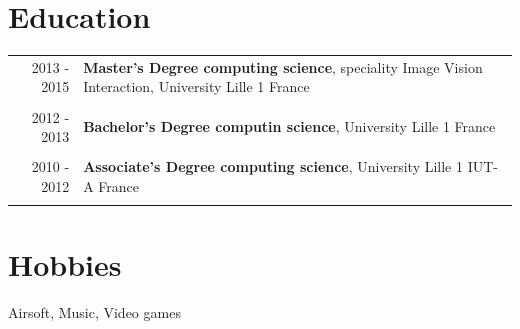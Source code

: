 \documentclass[9pt]{article}
\begin{document}
\section{Education}
\begin{tabular}{rl}    
	2013 - 2015& \textbf{Master's Degree computing science}, speciality Image Vision Interaction, {\small  University Lille 1 France}\\ & \\	
	2012 - 2013& \textbf{Bachelor's Degree computin science}, {\small  University Lille 1 France}\\ & \\	
	2010 - 2012& \textbf{Associate's Degree computing science}, {\small University Lille 1 IUT-A France}\\           & \\	
\end{tabular}
%
%
\section{Hobbies}   
Airsoft, Music, Video games \\
\end{document}
